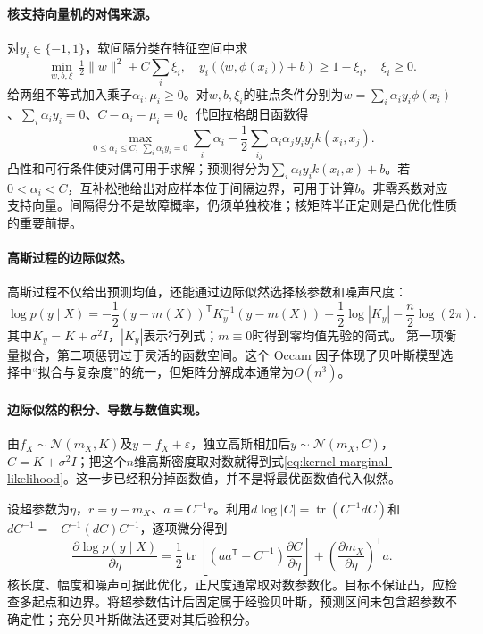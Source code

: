 \paragraph{核支持向量机的对偶来源。}
对$y_i\in\{-1,1\}$，软间隔分类在特征空间中求
\begin{equation}
 \min_{w,b,\xi}\ \tfrac12\|w\|^2+C\sum_i\xi_i,
 \quad y_i(\langle w,\phi(x_i)\rangle+b)\geq1-\xi_i,
 \quad\xi_i\geq0.
\end{equation}
给两组不等式加入乘子$\alpha_i,\mu_i\geq0$。对$w,b,\xi_i$的驻点条件分别为$w=\sum_i\alpha_iy_i\phi(x_i)$、$\sum_i\alpha_iy_i=0$、$C-\alpha_i-\mu_i=0$。代回拉格朗日函数得
\begin{equation}
 \max_{0\leq\alpha_i\leq C,\ \sum_i\alpha_iy_i=0}
 \sum_i\alpha_i-\frac12\sum_{ij}\alpha_i\alpha_jy_iy_jk(x_i,x_j).
\end{equation}
凸性和可行条件使对偶可用于求解；预测得分为$\sum_i\alpha_iy_ik(x_i,x)+b$。若$0<\alpha_i<C$，互补松弛给出对应样本位于间隔边界，可用于计算$b$。非零系数对应支持向量。间隔得分不是故障概率，仍须单独校准；核矩阵半正定则是凸优化性质的重要前提。

\paragraph{高斯过程的边际似然。}
高斯过程不仅给出预测均值，还能通过边际似然选择核参数和噪声尺度：
\begin{equation}
 \log p(y\mid X)=-\frac12(y-m(X))^{\mathsf T}K_y^{-1}(y-m(X))-\frac12\log|K_y|-\frac n2\log(2\pi).\label{eq:kernel-marginal-likelihood}
\end{equation}
其中$K_y=K+\sigma^2I$，$|K_y|$表示行列式；$m\equiv0$时得到零均值先验的简式。
第一项衡量拟合，第二项惩罚过于灵活的函数空间。这个 Occam 因子体现了贝叶斯模型选择中“拟合与复杂度”的统一，但矩阵分解成本通常为$O(n^3)$。

\paragraph{边际似然的积分、导数与数值实现。}
由$f_X\sim\mathcal N(m_X,K)$及$y=f_X+\varepsilon$，独立高斯相加后$y\sim\mathcal N(m_X,C)$，$C=K+\sigma^2I$；把这个$n$维高斯密度取对数就得到式\eqref{eq:kernel-marginal-likelihood}。这一步已经积分掉函数值，并不是将最优函数值代入似然。

设超参数为$\eta$，$r=y-m_X$、$a=C^{-1}r$。利用$d\log|C|=\operatorname{tr}(C^{-1}dC)$和$dC^{-1}=-C^{-1}(dC)C^{-1}$，逐项微分得到
\begin{equation}
 \frac{\partial\log p(y\mid X)}{\partial\eta}
 =\frac12\operatorname{tr}\left[(aa^{\mathsf T}-C^{-1})\frac{\partial C}{\partial\eta}\right]
  +\left(\frac{\partial m_X}{\partial\eta}\right)^{\mathsf T}a.
\end{equation}
核长度、幅度和噪声可据此优化，正尺度通常取对数参数化。目标不保证凸，应检查多起点和边界。将超参数估计后固定属于经验贝叶斯，预测区间未包含超参数不确定性；充分贝叶斯做法还要对其后验积分。

